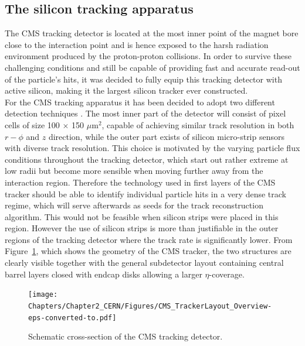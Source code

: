 \subsection{The silicon tracking apparatus}\label{sec::Tracker}
The CMS tracking detector is located at the most inner point of the magnet bore close to the interaction point and is hence exposed to the harsh radiation environment produced by the proton-proton collisions. In order to survive these challenging conditions and still be capable of providing fast and accurate read-out of the particle's hits, it was decided to fully equip this tracking detector with active silicon, making it the largest silicon tracker ever constructed.
\\
For the CMS tracking apparatus it has been decided to adopt two different detection techniques .
The most inner part of the detector will consist of pixel cells of size 100 $\times$ 150 $\mu$m$^{2}$, capable of achieving similar track resolution in both $r-\phi$ and $z$ direction, while the outer part exists of silicon micro-strip sensors with diverse track resolution. 
This choice is motivated by the varying particle flux conditions throughout the tracking detector, which start out rather extreme at low radii but become more sensible when moving further away from the interaction region. 
Therefore the technology used in first layers of the CMS tracker should be able to identify individual particle hits in a very dense track regime, which will serve afterwards as seeds for the track reconstruction algorithm. This would not be feasible when silicon strips were placed in this region. However the use of silicon strips is more than justifiable in the outer regions of the tracking detector where the track rate is significantly lower.
From Figure~\ref{fig::CMSTracker}, which shows the geometry of the CMS tracker, the two structures are clearly visible together with the general subdetector layout containing central barrel layers closed with endcap disks allowing a larger $\eta$-coverage.
\begin{figure}[h!t]
 \centering
 \texttt{[image: Chapters/Chapter2\_CERN/Figures/CMS\_TrackerLayout\_Overview-eps-converted-to.pdf]}
 \caption{Schematic cross-section of the CMS tracking detector.} \label{fig::CMSTracker}
\end{figure}

